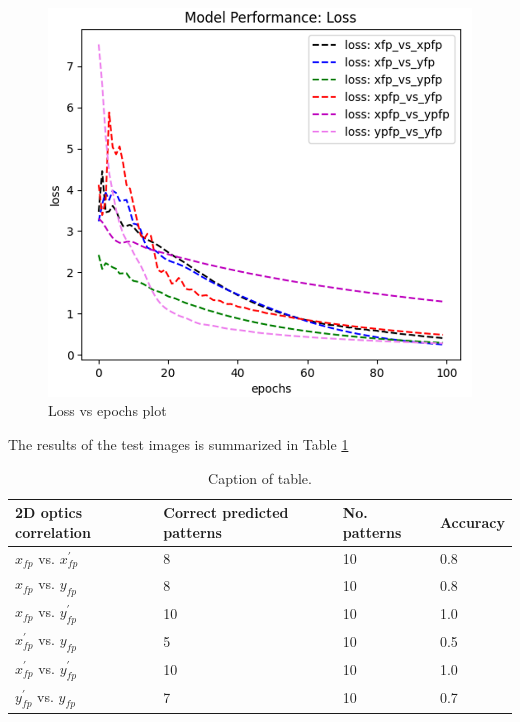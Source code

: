 \documentclass[conference]{IEEEtran}
\begin{document}
\begin{figure}[h]
  \centering
  \includegraphics[scale=0.3]{images/loss_plot.png}
  \caption{Loss vs epochs plot}
  \label{fig: epochs graph2}
\end{figure}


The results of the test images is summarized in Table \ref{tab:results}
\begin{table}[h]
	\begin{center}
		\begin{tabular}{llll} %
                  \hline
                  2D optics correlation   &  Correct predicted patterns &  No. patterns  & Accuracy \\ \hline \hline
                  $x_{fp}$ vs. $x^{'}_{fp}$  &  8  &  10  &  0.8\\
                  $x_{fp}$ vs. $y_{fp}$  &  8  &  10  &  0.8\\
                  $x_{fp}$ vs. $y^{'}_{fp}$  &  10  &  10  &  1.0\\
                  $x^{'}_{fp}$ vs. $y_{fp}$  &  5  &  10  &  0.5\\
                  $x^{'}_{fp}$ vs. $y^{'}_{fp}$  &  10  &  10  &  1.0\\
                  $y^{'}_{fp}$ vs. $y_{fp}$  &  7  &  10  &  0.7\\
		  \hline
		\end{tabular}
	\end{center}
	\caption{Caption of table.}
	\label{tab:results}
\end{table}
\end{document}

